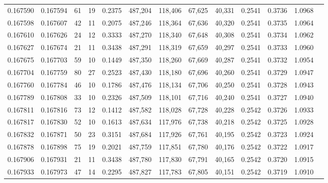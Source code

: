 \begin{tabular}{rrrrrrrrrrrrr}
0.167590 & 0.167594 &    61 &  19 &                                     0.2375 & 487,204 & 118,406 &  67,625 &  40,331 & 0.2541 & 0.3736 & 1.0968 \\
0.167598 & 0.167607 &    42 &  11 &                                     0.2075 & 487,246 & 118,364 &  67,636 &  40,320 & 0.2541 & 0.3735 & 1.0964 \\
0.167610 & 0.167626 &    24 &  12 &                                     0.3333 & 487,270 & 118,340 &  67,648 &  40,308 & 0.2541 & 0.3734 & 1.0962 \\
0.167627 & 0.167674 &    21 &  11 &                                     0.3438 & 487,291 & 118,319 &  67,659 &  40,297 & 0.2541 & 0.3733 & 1.0960 \\
0.167675 & 0.167703 &    59 &  10 &                                     0.1449 & 487,350 & 118,260 &  67,669 &  40,287 & 0.2541 & 0.3732 & 1.0954 \\
0.167704 & 0.167759 &    80 &  27 &                                     0.2523 & 487,430 & 118,180 &  67,696 &  40,260 & 0.2541 & 0.3729 & 1.0947 \\
0.167760 & 0.167784 &    46 &  10 &                                     0.1786 & 487,476 & 118,134 &  67,706 &  40,250 & 0.2541 & 0.3728 & 1.0943 \\
0.167789 & 0.167808 &    33 &  10 &                                     0.2326 & 487,509 & 118,101 &  67,716 &  40,240 & 0.2541 & 0.3727 & 1.0940 \\
0.167811 & 0.167816 &    73 &  12 &                                     0.1412 & 487,582 & 118,028 &  67,728 &  40,228 & 0.2542 & 0.3726 & 1.0933 \\
0.167817 & 0.167830 &    52 &  10 &                                     0.1613 & 487,634 & 117,976 &  67,738 &  40,218 & 0.2542 & 0.3725 & 1.0928 \\
0.167832 & 0.167871 &    50 &  23 &                                     0.3151 & 487,684 & 117,926 &  67,761 &  40,195 & 0.2542 & 0.3723 & 1.0924 \\
0.167878 & 0.167898 &    75 &  19 &                                     0.2021 & 487,759 & 117,851 &  67,780 &  40,176 & 0.2542 & 0.3722 & 1.0917 \\
0.167906 & 0.167931 &    21 &  11 &                                     0.3438 & 487,780 & 117,830 &  67,791 &  40,165 & 0.2542 & 0.3720 & 1.0915 \\
0.167933 & 0.167973 &    47 &  14 &                                     0.2295 & 487,827 & 117,783 &  67,805 &  40,151 & 0.2542 & 0.3719 & 1.0910 \\

\end{tabular}
